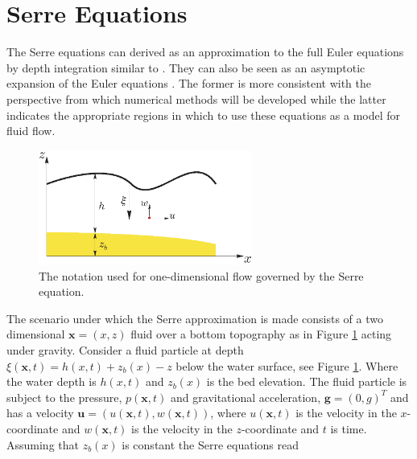 \documentclass[SingleSpace,12pt,Journal]{Serre_ASCE}
\begin{document}
\section{Serre Equations}
\label{section:Serre Equations}
The Serre equations can derived as an approximation to the full Euler equations by depth integration similar to \cite{Su-Gardener-1969-536}. They can also be seen as an asymptotic expansion of the Euler equations \cite{Bonneton-Lannes-2009-16601}. The former is more consistent with the perspective from which numerical methods will be developed while the latter indicates the appropriate regions in which to use these equations as a model for fluid flow.
\begin{figure}[htb]
\begin{center}
\includegraphics[width=7.0cm]{pics/explainers/one-dimensional-axis_Serre.eps}
\end{center}
\caption{The notation used for one-dimensional flow governed by the Serre equation.}
\label{fig:Notation}
\end{figure}
The scenario under which the Serre approximation is made consists of a two dimensional $\textbf{x} = (x,z)$ fluid over a bottom topography as in Figure \ref{fig:Notation} acting under gravity. Consider a fluid particle at depth  $\xi(\textbf{x},t) = h(x,t) + z_b(x) - z$ below the water surface, see Figure \ref{fig:Notation}. Where the water depth is $h(x,t)$ and $z_b(x)$ is the bed elevation. The fluid particle is subject to the pressure, $p(\textbf{x},t)$ and  gravitational acceleration, $\textbf{g} = (0,g)^T$ and has a velocity $\textbf{u} = (u(\textbf{x},t),w(\textbf{x},t))$,  where $u(\textbf{x},t)$ is the velocity in the $x$-coordinate and $w(\textbf{x},t)$ is the velocity in the $z$-coordinate and $t$ is time. Assuming that $z_b(x)$ is constant the Serre equations read \cite{Guyenne-etal-2014-169}
\end{document}
